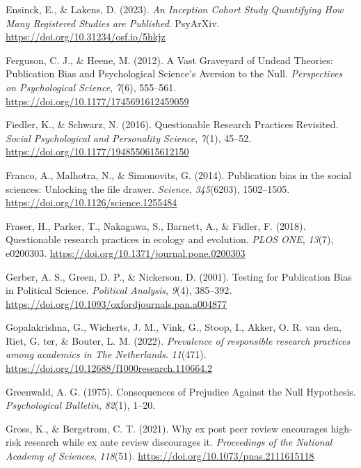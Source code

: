 \documentclass[
  ,man,mask,floatsintext]{apa6}
\newlength{\cslhangindent}
\newlength{\cslentryspacingunit} %
\newenvironment{CSLReferences}[2] %
 {%
  \setlength{\parindent}{0pt}
  \ifodd #1
  \let\oldpar\par
  \def\par{\hangindent=\cslhangindent\oldpar}
  \fi
  \setlength{\parskip}{#2\cslentryspacingunit}
 }%
 {}
\begin{document}
\begin{CSLReferences}{1}{0}
\leavevmode{}%
Ensinck, E., \& Lakens, D. (2023). \emph{An {Inception Cohort Study Quantifying How Many Registered Studies} are {Published}}. PsyArXiv. \url{https://doi.org/10.31234/osf.io/5hkjz}

\leavevmode{}%
Ferguson, C. J., \& Heene, M. (2012). A {Vast Graveyard} of {Undead Theories}: {Publication Bias} and {Psychological Science}'s {Aversion} to the {Null}. \emph{Perspectives on Psychological Science}, \emph{7}(6), 555--561. \url{https://doi.org/10.1177/1745691612459059}

\leavevmode{}%
Fiedler, K., \& Schwarz, N. (2016). Questionable {Research Practices Revisited}. \emph{Social Psychological and Personality Science}, \emph{7}(1), 45--52. \url{https://doi.org/10.1177/1948550615612150}

\leavevmode{}%
Franco, A., Malhotra, N., \& Simonovits, G. (2014). Publication bias in the social sciences: {Unlocking} the file drawer. \emph{Science}, \emph{345}(6203), 1502--1505. \url{https://doi.org/10.1126/science.1255484}

\leavevmode{}%
Fraser, H., Parker, T., Nakagawa, S., Barnett, A., \& Fidler, F. (2018). Questionable research practices in ecology and evolution. \emph{PLOS ONE}, \emph{13}(7), e0200303. \url{https://doi.org/10.1371/journal.pone.0200303}

\leavevmode{}%
Gerber, A. S., Green, D. P., \& Nickerson, D. (2001). Testing for {Publication Bias} in {Political Science}. \emph{Political Analysis}, \emph{9}(4), 385--392. \url{https://doi.org/10.1093/oxfordjournals.pan.a004877}

\leavevmode{}%
Gopalakrishna, G., Wicherts, J. M., Vink, G., Stoop, I., Akker, O. R. van den, Riet, G. ter, \& Bouter, L. M. (2022). \emph{Prevalence of responsible research practices among academics in {The Netherlands}}. \emph{11}(471). \url{https://doi.org/10.12688/f1000research.110664.2}

\leavevmode{}%
Greenwald, A. G. (1975). Consequences of {Prejudice Against} the {Null Hypothesis}. \emph{Psychological Bulletin}, \emph{82}(1), 1--20.

\leavevmode{}%
Gross, K., \& Bergstrom, C. T. (2021). Why ex post peer review encourages high-risk research while ex ante review discourages it. \emph{Proceedings of the National Academy of Sciences}, \emph{118}(51). \url{https://doi.org/10.1073/pnas.2111615118}


\end{CSLReferences}
\end{document}
